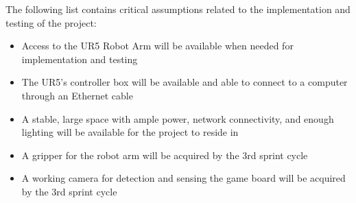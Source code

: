 The following list contains critical assumptions related to the implementation and testing of the project:

\begin{itemize}
    \item Access to the UR5 Robot Arm will be available when needed for implementation and testing
    \item The UR5's controller box will be available and able to connect to a computer through an Ethernet cable
    \item A stable, large space with ample power, network connectivity, and enough lighting will be available for the project to reside in
    \item A gripper for the robot arm will be acquired by the 3rd sprint cycle
    \item A working camera for detection and sensing the game board will be acquired by the 3rd sprint cycle
\end{itemize}





